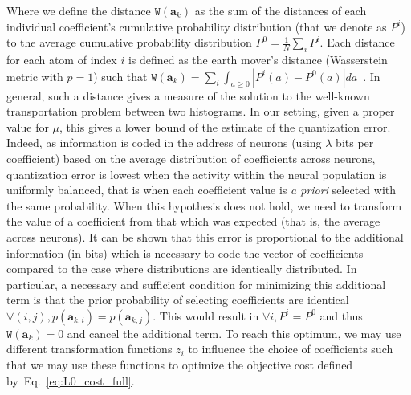 \documentclass[vision,article,submit,oneauthor,pdftex]{Definitions/mdpi}
\newcommand{\coef}{\mathbf{a}} %
\newcommand{\image}{\mathbf{y}} %
\newcommand{\seeEq}[1]{Eq.~\ref{eq:#1}}%
\begin{document}
Where we define the distance $\texttt{W}(\coef_{k})$ as the sum of the distances of each individual coefficient's cumulative probability distribution (that we denote as $P^i$) to the average cumulative probability distribution $P^0 = \frac 1 N \sum_i P^i$. Each distance for each atom of index $i$ is defined as the earth mover's distance (Wasserstein metric with $p=1$) such that $ \texttt{W}(\coef_{k}) = \sum_i \int_{a\geq0} | P^i(a) - P^0(a)| da $~\citep{Vallender74}. In general, such a distance gives a measure of the solution to the well-known transportation problem between two histograms. In our setting, given a proper value for $\mu$, this gives a lower bound of the estimate of the quantization error. Indeed, as information is coded in the address of neurons (using $\lambda$ bits per coefficient) based on the average distribution of coefficients across neurons, quantization error is lowest when the activity within the neural population is uniformly balanced, that is when each coefficient value is \emph{a priori} selected with the same probability. When this hypothesis does not hold, we need to transform the value of a coefficient from that which was expected (that is, the average across neurons). It can be shown that this error is proportional to the additional information (in bits) which is necessary to code the vector of coefficients compared to the case where distributions are identically distributed. In particular, a necessary and sufficient condition for minimizing this additional term is that the prior probability of selecting coefficients are identical $\forall (i,j), p(\coef_{k,i})=p(\coef_{k,j})$. This would result in $\forall i, P^i = P^0$ and thus $\texttt{W}(\coef_{k})= 0$ and cancel the additional term. To reach this optimum, we may use different transformation functions $z_i$ to influence the choice of coefficients such that we may use these functions to optimize the objective cost defined by~\seeEq{L0_cost_full}.
\end{document}
